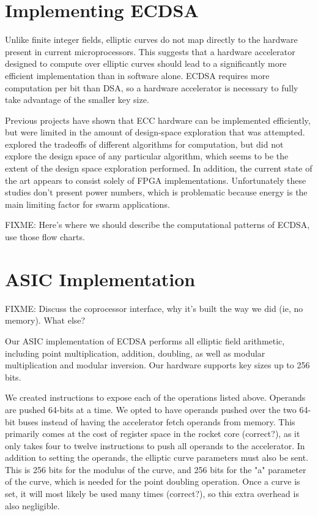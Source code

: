 \documentclass[twocolumn]{article}
\begin{document}
\section{Implementing ECDSA}

Unlike finite integer fields, elliptic curves do not map directly to
the hardware present in current microprocessors\cite{kss-ecdsa}. This
suggests that a hardware accelerator designed to compute over elliptic
curves should lead to a significantly more efficient implementation
than in software alone.  ECDSA requires more computation per bit than
DSA, so a hardware accelerator is necessary to fully take advantage of
the smaller key size.

Previous projects\cite{nnll-ecdsa_hw} have shown that ECC hardware can
be implemented efficiently, but were limited in the amount of
design-space exploration that was attempted.  \cite{mmm-hw_ecc}
explored the tradeoffs of different algorithms for computation, but
did not explore the design space of any particular algorithm, which
seems to be the extent of the design space exploration performed.  In
addition, the current state of the art appears to consist solely of
FPGA implementations.  Unfortunately these studies don't present power
numbers, which is problematic because energy is the main limiting
factor for swarm applications.

FIXME: Here's where we should describe the computational patterns of
ECDSA, use those flow charts.

\section{ASIC Implementation}

FIXME: Discuss the coprocessor interface, why it's built the way we
did (ie, no memory).  What else?

Our ASIC implementation of ECDSA performs all elliptic field arithmetic,
including point multiplication, addition, doubling, as well as modular
multiplication and modular inversion. Our hardware supports key sizes
up to 256 bits. 

We created instructions to expose each of the operations listed above. Operands
are pushed 64-bits at a time. We opted to have operands pushed over the two 64-bit
buses instead of having the accelerator fetch operands from memory. This primarily 
comes at the cost of register space in the rocket core (correct?), as it only takes 
four to twelve instructions to push all operands to the accelerator. In addition to 
setting the operands, the elliptic curve parameters must also be sent. This is 256 bits
for the modulus of the curve, and 256 bits for the "a" parameter of the curve, which
is needed for the point doubling operation. Once a curve is set, it will most likely
be used many times (correct?), so this extra overhead is also negligible. 
\end{document}
